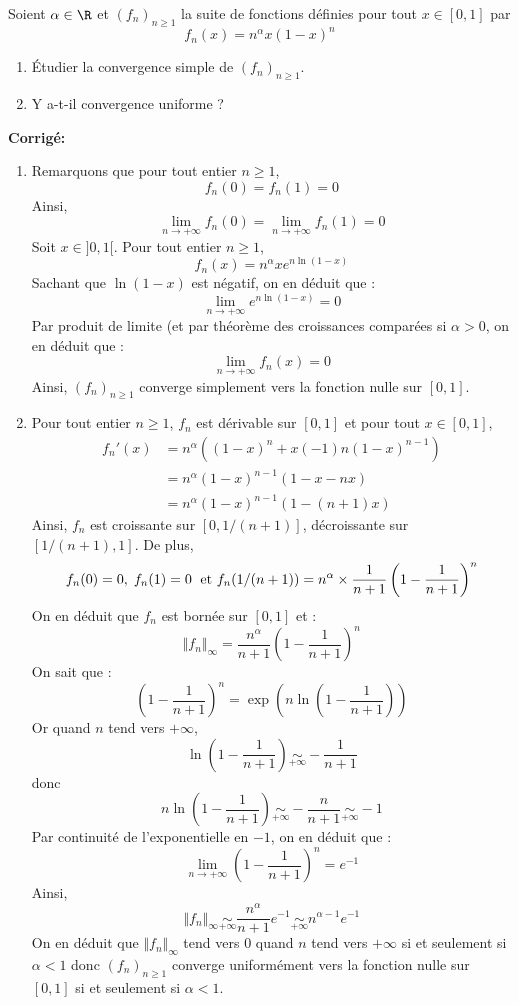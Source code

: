 \documentclass[a4paper,twoside,french,11pt]{VcCours}
\newcommand{\corr}{\textbf{Corrigé:}}
\begin{document}
\medskip


\begin{Exercice}{} Soient $\alpha \in \R$ et $(f_n)_{n \geq 1}$ la suite de fonctions définies pour tout $x \in [0,1]$ par 
$$f_n(x) = n^\alpha x(1-x)^n$$

\begin{enumerate}
 \item Étudier la convergence simple de $(f_n)_{n \geq 1}$.
 \item Y a-t-il convergence uniforme ?
  \end{enumerate}
\end{Exercice}

\corr 

\begin{enumerate}
\item Remarquons que pour tout entier $n \geq 1$,
$$ f_n(0)=f_n(1)=0$$
Ainsi,
$$ \lim_{n \rightarrow + \infty} f_n(0) = \lim_{n \rightarrow + \infty} f_n(1) = 0$$
Soit $x \in ]0,1[$. Pour tout entier $n \geq 1$,
$$ f_n(x) = n^{\alpha} x e^{n \ln(1-x)}$$
Sachant que $\ln(1-x)$ est négatif, on en déduit que :
$$ \lim_{n \rightarrow + \infty}e^{n \ln(1-x)} = 0$$
Par produit de limite (et par théorème des croissances comparées si $\alpha>0$, on en déduit que :
$$ \lim_{n \rightarrow + \infty} f_n(x) = 0$$
Ainsi, $(f_n)_{n \geq 1}$ converge simplement vers la fonction nulle sur $[0,1]$.
\item Pour tout entier $n \geq 1$, $f_n$ est dérivable sur $[0,1]$ et pour tout $x \in [0,1]$,
\begin{align*}
 f_n'(x) & = n^{\alpha} ((1-x)^n + x (-1) n (1-x)^{n-1}) \\
 & = n^{\alpha} (1-x)^{n-1} (1-x-nx) \\
 & = n^{\alpha} (1-x)^{n-1} (1-(n+1)x) 
 \end{align*}
Ainsi, $f_n$ est croissante sur $[0, 1/(n+1)]$, décroissante sur $[1/(n+1), 1]$. De plus,
$$ f_n(0)=0, \; f_n(1)=0 \; \hbox{ et } f_n(1/(n+1)) =n^{\alpha} \times \dfrac{1}{n+1} \left(1- \dfrac{1}{n+1}\right)^{n}$$
On en déduit que $f_n$ est bornée sur $[0,1]$ et :
$$ \Vert f_n \Vert_{\infty} =   \dfrac{n^{\alpha}}{n+1} \left(1- \dfrac{1}{n+1}\right)^{n}$$
On sait que :
$$\left(1- \dfrac{1}{n+1}\right)^{n} = \exp \left(n \ln \left(1- \dfrac{1}{n+1}\right) \right) $$
Or quand $n$ tend vers $+ \infty$,
$$ \ln \left(1- \dfrac{1}{n+1}\right) \underset{+ \infty}{\sim} - \dfrac{1}{n+1}$$
donc 
$$ n \ln \left(1- \dfrac{1}{n+1}\right) \underset{+ \infty}{\sim} - \dfrac{n}{n+1} \underset{+ \infty}{\sim} -1$$
Par continuité de l'exponentielle en $-1$, on en déduit que :
$$ \lim_{n \rightarrow + \infty} \left(1- \dfrac{1}{n+1}\right)^{n} = e^{-1}$$
Ainsi,
$$  \Vert f_n \Vert_{\infty} \underset{+ \infty}{\sim} \dfrac{n^{\alpha}}{n+1} e^{-1} \underset{+ \infty}{\sim} n^{\alpha-1} e^{-1}$$
On en déduit que $\Vert f_n \Vert_{\infty}$ tend vers $0$ quand $n$ tend vers $+ \infty$ si et seulement si $\alpha<1$ donc $(f_n)_{n \geq 1}$ converge uniformément vers la fonction nulle sur $[0,1]$ si et seulement si $\alpha<1$.
\end{enumerate}
\end{document}
